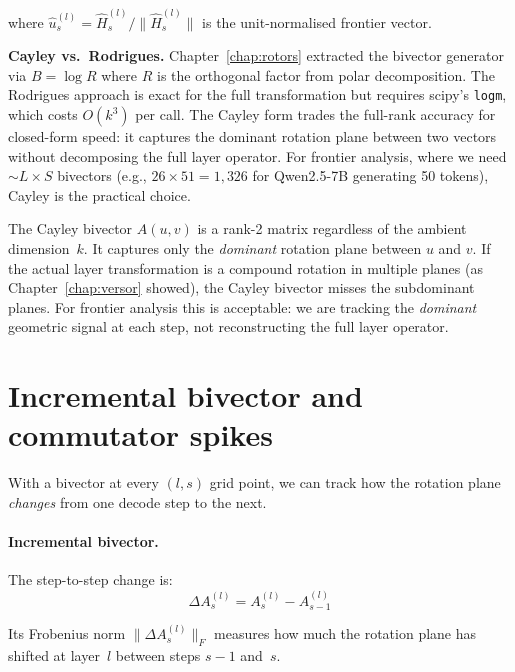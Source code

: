 \documentclass[11pt, twoside, openright]{memoir}
\numberwithin{equation}{chapter}
\begin{document}
where $\hat{u}^{(l)}_s = \hat{H}^{(l)}_s / \|\hat{H}^{(l)}_s\|$
is the unit-normalised frontier vector.

\begin{gabox}
\textbf{Cayley vs.\ Rodrigues.}
Chapter~\ref{chap:rotors} extracted the bivector generator via
$B = \log R$ where $R$ is the orthogonal factor from polar
decomposition.  The Rodrigues approach is exact for the full
transformation but requires scipy's \texttt{logm}, which costs
$O(k^3)$ per call.  The Cayley form trades the full-rank accuracy
for closed-form speed: it captures the dominant rotation plane
between two vectors without decomposing the full layer operator.
For frontier analysis, where we need $\sim\!L \times S$ bivectors
(e.g., $26 \times 51 = 1{,}326$ for Qwen2.5-7B generating 50
tokens), Cayley is the practical choice.
\end{gabox}

\begin{pitfall}
The Cayley bivector $A(u,v)$ is a rank-2 matrix regardless of
the ambient dimension~$k$.  It captures only the \emph{dominant}
rotation plane between $u$ and $v$.  If the actual layer
transformation is a compound rotation in multiple planes (as
Chapter~\ref{chap:versor} showed), the Cayley bivector misses the
subdominant planes.  For frontier analysis this is acceptable:
we are tracking the \emph{dominant} geometric signal at each step,
not reconstructing the full layer operator.
\end{pitfall}


\section{Incremental bivector and commutator spikes}
\label{sec:frontier-commutator}

With a bivector at every $(l, s)$ grid point, we can track how the
rotation plane \emph{changes} from one decode step to the next.

\paragraph{Incremental bivector.}
The step-to-step change is:
\begin{equation}
  \Delta A^{(l)}_s = A^{(l)}_s - A^{(l)}_{s-1}
\end{equation}

Its Frobenius norm $\|\Delta A^{(l)}_s\|_F$ measures how much the
rotation plane has shifted at layer~$l$ between steps $s-1$
and~$s$.
\end{document}
